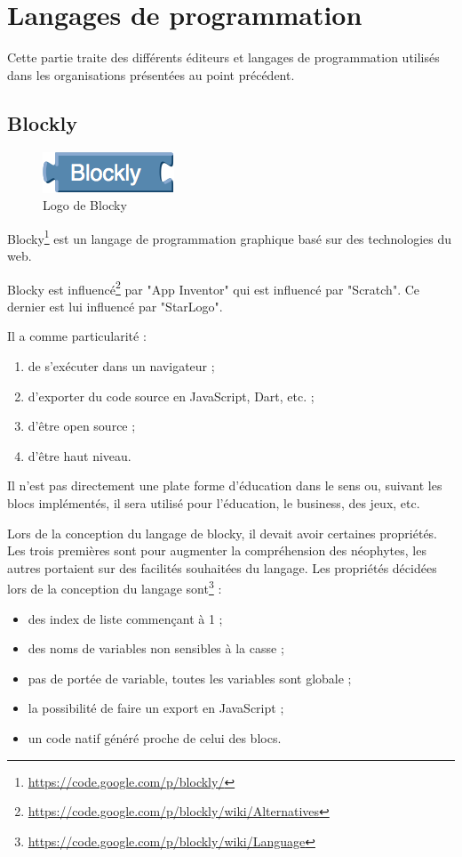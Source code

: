 \section{Langages de programmation}
Cette partie traite des différents éditeurs et langages de programmation utilisés dans les organisations présentées au point précédent.
\subsection{Blockly}
\label{blockly}
\begin{figure}[!h]
  \begin{center}
    \includegraphics[scale=0.5]{content/5-related_work/images/blocky}
    \caption{Logo de Blocky}
    \label{fig:blocky}
  \end{center}
\end{figure}
Blocky\footnote{\url{https://code.google.com/p/blockly/}} est un langage de programmation graphique basé sur des technologies du web. 

Blocky est influencé\footnote{\url{https://code.google.com/p/blockly/wiki/Alternatives}} par "App Inventor" qui est influencé par "Scratch". Ce dernier est lui influencé par "StarLogo".

Il a comme particularité :
\begin{enumerate}
\item de s'exécuter dans un navigateur ;
\item d'exporter du code source en JavaScript, Dart, etc. ;
\item d'être open source ;
\item d'être haut niveau.
\end{enumerate}

Il n'est pas directement une plate forme d'éducation dans le sens ou, suivant les blocs implémentés, il sera utilisé pour l'éducation, le business, des jeux, etc.

Lors de la conception du langage de blocky, il devait avoir certaines propriétés. Les trois premières sont pour augmenter la compréhension des néophytes, les autres portaient sur des facilités souhaitées du langage. Les propriétés décidées lors de la conception du langage sont\footnote{\url{https://code.google.com/p/blockly/wiki/Language}} :

\begin{itemize}
  \item des index de liste commençant à 1 ;
  \item des noms de variables non sensibles à la casse ;
  \item pas de portée de variable, toutes les variables sont globale ;
  \item la possibilité de faire un export en JavaScript ;
  \item un code natif généré proche de celui des blocs.
\end{itemize}

